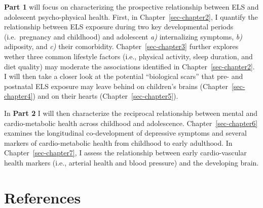 \documentclass[
  letterpaper,
  DIV=11,
  numbers=noendperiod]{scrreport}
\begin{document}
\textbf{Part 1} will focus on characterizing the prospective
relationship between ELS and adolescent psycho-physical health. First,
in Chapter~\ref{sec-chapter2}, I quantify the relationship between ELS
exposure during two key developmental periods (i.e.~pregnancy and
childhood) and adolescent \emph{a)} internalizing symptoms, \emph{b)}
adiposity, and \emph{c)} their comorbidity. Chapter~\ref{sec-chapter3}
further explores wether three common lifestyle factors (i.e., physical
activity, sleep duration, and diet quality) may moderate the
associations identified in Chapter~\ref{sec-chapter2}. I will then take
a closer look at the potential ``biological scars'' that pre- and
postnatal ELS exposure may leave behind on children's brains
(Chapter~\ref{sec-chapter4}) and on their hearts
(Chapter~\ref{sec-chapter5}).

In \textbf{Part 2} I will then characterize the reciprocal relationship
between mental and cardio-metabolic health across childhood and
adolescence. Chapter~\ref{sec-chapter6} examines the longitudinal
co-development of depressive symptoms and several markers of
cardio-metabolic health from childhood to early adulthood. In
Chapter~\ref{sec-chapter7}, I assess the relationship between early
cardio-vascular health markers (i.e., arterial health and blood
pressure) and the developing brain.

\section*{References}\label{references}

\end{document}
